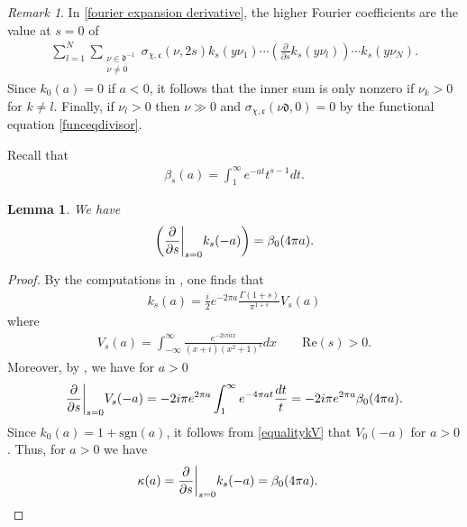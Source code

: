 \documentclass[twoside,a4paper,10pt]{article} %
\newcommand{\dds}{\restr{\frac{\partial}{\partial s}}{s=0}}
\newcommand{\8}{\infty}
\newcommand{\dfrak}{\mathfrak{d}}
\newcommand{\cfrak}{\mathfrak{c}}
\newcommand{\sgn}{\mathrm{sgn}}
\newcommand{\re}{\mathrm{Re}}
\newcommand\restr[2]{{%
  \left.\kern-\nulldelimiterspace %
  #1 %
  \vphantom{\big|} %
  \right|_{#2} %
  }}
\theoremstyle{mytheoremstyle}
\newtheorem{lem}[thm]{Lemma}
\theoremstyle{remark}
\newtheorem{rmk}{Remark}[section]
\numberwithin{equation}{section}
\begin{document}
\begin{rmk} In \eqref{fourier expansion derivative}, the higher Fourier coefficients are the value at $s=0$ of
\begin{align}
\sum_{l=1}^N\sum_{\substack{\nu \in \dfrak^{-1} \\ \nu \neq 0}} \sigma_{\chi,\cfrak}(\nu,2s)k_s(y\nu_1) \cdots \left ( \frac{\partial}{\partial s}k_s(y\nu_l) \right )  \cdots k_s(y\nu_N).
\end{align}
Since $k_0(a)=0$ if $a<0$, it follows that the inner sum is only nonzero if $\nu_k>0$ for $k\neq l$. Finally, if $\nu_l>0$ then $\nu \gg 0$ and $\sigma_{\chi,\cfrak}(\nu\dfrak,0)=0$ by the functional equation \eqref{funceqdivisor}.
\end{rmk}
Recall that 
\begin{align}
\beta_{s}(a)=\int_1^\8e^{-at}t^{s-1}dt.
\end{align}

\begin{lem} We have \begin{align}
\left ( \dds k_s(-a) \right )=  \beta_{0}(4\pi a ).
\end{align}
\end{lem}
\begin{proof}
By the computations in \cite[Proposition.~3.3 p.~278]{gz86}, one finds that
\begin{align} \label{equalitykV}
k_s(a)= \frac{i}{2}e^{-2\pi a} \frac{\Gamma(1+s)}{\pi^{1+s}} V_s(a)
\end{align}
where
\begin{align}
V_s(a)=\int_{-\8}^\8 \frac{e^{-2i \pi ax}}{(x+i)(x^2+1)^s}dx \qquad \re(s)>0.
\end{align}
Moreover, by  \cite[Proposition.~3.3 e)]{gz86}, we have for $a>0$
\begin{align}
\dds V_s(-a)=-2i\pi e^{2\pi a} \int_1^\8e^{-4\pi a t} \frac{dt}{t} = -2i\pi e^{2\pi a}\beta_{0}(4\pi a ).
 \end{align}
Since $k_0(a)=1+\sgn(a)$, it follows from \eqref{equalitykV} that $V_0(-a)$ for $a>0$. Thus, for $a>0$ we have
\begin{align}
\kappa(a)& = \dds k_s(-a) = \beta_{0}(4\pi a ).
\end{align}
\end{proof}
\end{document}
